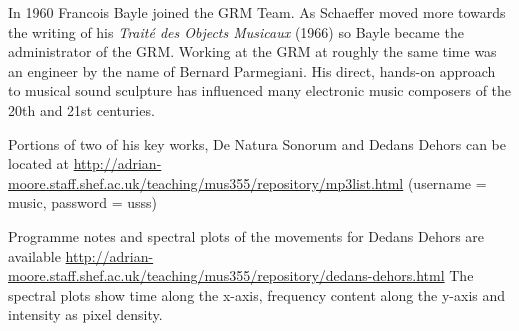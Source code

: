 In 1960 Francois Bayle joined the GRM Team. As Schaeffer moved more towards the writing of his \textit{Trait\'e des Objects Musicaux} (1966) so Bayle became the administrator of the GRM. Working at the GRM at roughly the same time was an engineer by the name of Bernard
Parmegiani. His direct, hands-on approach to musical sound sculpture has influenced many electronic music composers of the 20th and 21st centuries.

Portions of two of his key works, De Natura Sonorum and Dedans Dehors can be located at \url{http://adrian-moore.staff.shef.ac.uk/teaching/mus355/repository/mp3list.html} (username = music, password = usss)

Programme notes and spectral plots of the movements for Dedans Dehors are available \url{http://adrian-moore.staff.shef.ac.uk/teaching/mus355/repository/dedans-dehors.html} The spectral plots show time along the x-axis, frequency content along the y-axis and
intensity as pixel density.


